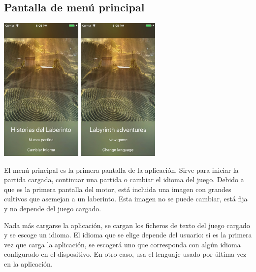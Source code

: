 \subsection{Pantalla de menú principal}
\begin{center}
	\includegraphics[width=0.3\textwidth]{include/snapshots/mainMenu-es.jpg}
	\includegraphics[width=0.3\textwidth]{include/snapshots/mainMenu-en.jpg}
\end{center}
El menú principal es la primera pantalla de la aplicación. Sirve para iniciar la partida cargada, continuar una partida o cambiar el idioma del juego. Debido a que es la primera pantalla del motor, está incluida una imagen con grandes cultivos que asemejan a un laberinto. Esta imagen no se puede cambiar, está fija y no depende del juego cargado.

Nada más cargarse la aplicación, se cargan los ficheros de texto del juego cargado y se escoge un idioma.
El idioma que se elige depende del usuario: si es la primera vez que carga la aplicación, se escogerá uno que corresponda con algún idioma configurado en el dispositivo. En otro caso, usa el lenguaje usado por última vez en la aplicación.

